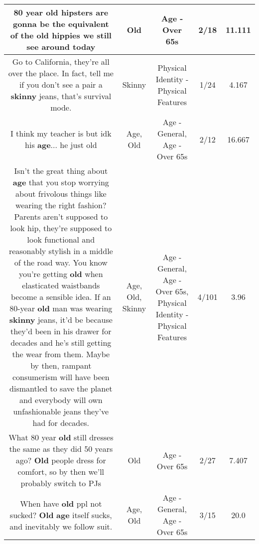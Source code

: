 \documentclass[11pt]{article}
\newlength\mylength
\begin{document}
\begin{center}
\begin{longtable}{|C{.65\mylength}|C{.30\mylength}|C{.12\mylength}|C{.12\mylength}|C{.12\mylength}|}
  \small 80 year \textbf{old} hipsters are gonna be the equivalent of the \textbf{old} hippies we still see around today\normalsize   & Old & Age - Over 65s & 2/18 & 11.111 \\  \hline
  \small Go to California, they're all over the place. In fact, tell me if you don't see a pair a \textbf{skinny} jeans, that's survival mode.\normalsize   & Skinny & Physical Identity - Physical Features & 1/24 & 4.167 \\  \hline
  \small I think my teacher is but idk his \textbf{age}... he just old\normalsize   & Age, Old & Age - General, Age - Over 65s & 2/12 & 16.667 \\  \hline
  \small Isn't the great thing about \textbf{age} that you stop worrying about frivolous things like wearing the right fashion? Parents aren't supposed to look hip, they're supposed to look functional and reasonably stylish in a middle of the road way. You know you're getting \textbf{old} when elasticated waistbands become a sensible idea. If an 80-year \textbf{old} man was wearing \textbf{skinny} jeans, it'd be because they'd been in his drawer for decades and he's still getting the wear from them. Maybe by then, rampant consumerism will have been dismantled to save the planet and everybody will own unfashionable jeans they've had for decades.\normalsize   & Age, Old, Skinny & Age - General, Age - Over 65s, Physical Identity - Physical Features & 4/101 & 3.96 \\  \hline
  \small What 80 year \textbf{old} still dresses the same as they did 50 years ago? \textbf{Old} people dress for comfort, so by then we'll probably switch to PJs\normalsize   & Old & Age - Over 65s & 2/27 & 7.407 \\  \hline
  \small When have \textbf{old} ppl not sucked? \textbf{Old} \textbf{age} itself sucks, and inevitably we follow suit.\normalsize   & Age, Old & Age - General, Age - Over 65s & 3/15 & 20.0 \\  \hline

\end{longtable}
\end{center}
\end{document}
